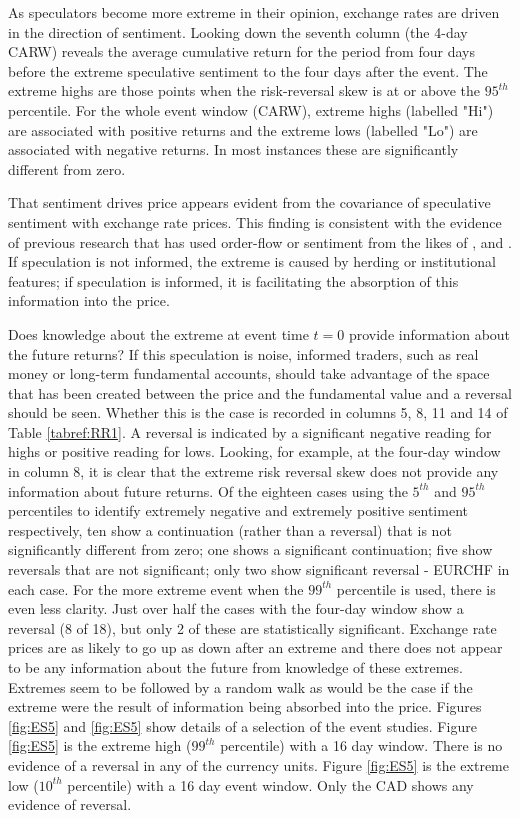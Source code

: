 \documentclass[ijfs,article,submit,oneauthor,pdftex,10pt,a4paper]{mdpi}
\begin{document}
As speculators become more extreme in their opinion, exchange rates are driven in the direction of sentiment. Looking down the seventh column (the 4-day CARW) reveals the average cumulative return for the period from four days before the extreme speculative sentiment to the four days after the event.   The extreme highs are those points when the risk-reversal skew is at or above the $95^{th}$ percentile.  For the whole event window (CARW), extreme highs (labelled "Hi") are associated with positive returns and the extreme lows (labelled "Lo") are associated with negative returns. In most instances these are significantly different from zero.  

That sentiment drives price appears evident from the covariance of speculative sentiment with exchange rate prices. This finding is consistent with the evidence of previous research that has used order-flow or sentiment from the likes of \citet{Evans2002Order}, \citet{FuturesSanders} and \citet{FuturesWang}. If speculation is not informed, the extreme is caused by herding or institutional features; if speculation is informed, it is facilitating the absorption of this information into the price. 

Does knowledge about the extreme at event time $t = 0$ provide information about the future returns?  If this speculation is noise, informed traders, such as real money or long-term fundamental accounts, should take advantage of the space that has been created between the price and the fundamental value and a reversal should be seen.  Whether this is the case is recorded in columns 5, 8, 11 and 14 of Table \ref{tabref:RR1}. A reversal is indicated by a significant negative reading for highs or positive reading for lows.   Looking, for example, at the four-day window in column 8, it is clear that the extreme risk reversal skew does not provide any information about future returns.  Of the eighteen cases using the $5^{th}$ and $95^{th}$ percentiles to identify extremely negative and extremely positive sentiment respectively, ten show a continuation (rather than a reversal) that is not significantly different from zero; one shows a significant continuation; five show reversals that are not significant; only two show significant reversal - EURCHF in each case.  For the more extreme event when the $99^{th}$ percentile is used, there is even less clarity.  Just over half the cases with the four-day window show a reversal (8 of 18), but only 2 of these are statistically significant. Exchange rate prices are as likely to go up as down after an extreme and there does not appear to be any information about the future from knowledge of these extremes. Extremes seem to be followed by a random walk as would be the case if the extreme were the result of information being absorbed into the price.  Figures \ref{fig:ES5} and \ref{fig:ES5} show details of a selection of the event studies.  Figure \ref{fig:ES5} is the extreme high ($99^{th}$ percentile) with a 16 day window. There is no evidence of a reversal in any of the currency units.   Figure \ref{fig:ES5} is the extreme low ($10^{th}$ percentile) with a 16 day event window.  Only the CAD shows any evidence of reversal. 
\end{document}
